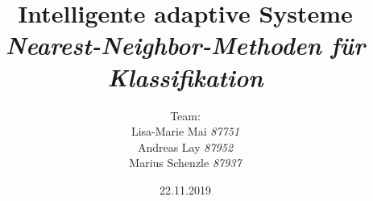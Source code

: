 

\title{\textbf{Intelligente adaptive Systeme}\\\textit{Nearest-Neighbor-Methoden für Klassifikation}}
\author{Team:\\Lisa-Marie Mai \textit{87751}\\Andreas Lay \textit{87952}\\Marius Schenzle \textit{87937} \vspace{10px}}
\date{22.11.2019}


\doublespacing
{}
\maketitle
\newpage
\tableofcontents
\newpage
\singlespacing
{}


\newpage


\newpage


\newpage

% 





